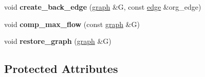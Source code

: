 \begin{DoxyCompactItemize}
void {\bfseries create\+\_\+back\+\_\+edge} (\mbox{\hyperlink{classgraph}{graph}} \&G, const \mbox{\hyperlink{classedge}{edge}} \&org\+\_\+edge)
\item 
\mbox{\label{classmaxflow__pp_a6a8a301739757493318b1abfbed2698b}} 
void {\bfseries comp\+\_\+max\+\_\+flow} (const \mbox{\hyperlink{classgraph}{graph}} \&G)
\item 
\mbox{\label{classmaxflow__pp_a273cc9bde3aeb47c08223da7458ed29d}} 
void {\bfseries restore\+\_\+graph} (\mbox{\hyperlink{classgraph}{graph}} \&G)
\end{DoxyCompactItemize}
\subsection*{Protected Attributes}
